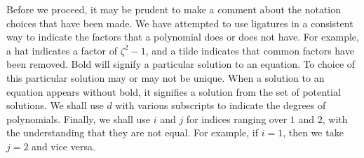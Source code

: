 Before we proceed, it may be prudent to make a comment about the notation choices that have been made. We have attempted to use ligatures in a consistent way to indicate the factors that a polynomial does or does not have. For example, a hat indicates a factor of $ζ^2-1$, and a tilde indicates that common factors have been removed. Bold will signify a particular solution to an equation. To choice of this particular solution may or may not be unique. When a solution to an equation appears without bold, it signifies a solution from the set of potential solutions. We shall use $d$ with various subscripts to indicate the degrees of polynomials. Finally, we shall use $i$ and $j$ for indices ranging over $1$ and $2$, with the understanding that they are not equal. For example, if $i=1$, then we take $j=2$ and vice versa.




